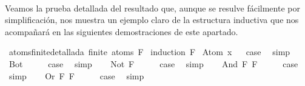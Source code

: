 \begin{isabellebody}
\begin{isamarkuptext}
\\%
\end{isamarkuptext}\isamarkuptrue%
%
\begin{isamarkuptext}%
Veamos la prueba detallada del resultado que, aunque se resulve 
fácilmente por simplificación, nos muestra un ejemplo claro de la estructura inductiva
que nos acompañará en las siguientes demostraciones de este apartado.%
\end{isamarkuptext}\isamarkuptrue%
\isamarkupfalse%
\ atoms{\isacharunderscore}finite{\isacharunderscore}detallada{\isacharcolon}\ {\isachardoublequoteopen}finite\ {\isacharparenleft}atoms\ F{\isacharparenright}{\isachardoublequoteclose}\isanewline
%
\isadelimproof
%
\endisadelimproof
%
\isatagproof
{}\isamarkupfalse%
\ {\isacharparenleft}induction\ F{\isacharparenright}\isanewline
{}\isamarkupfalse%
\ {\isacharparenleft}Atom\ x{\isacharparenright}\isanewline
{}\isamarkupfalse%
\ \isamarkupfalse%
\ {\isacharquery}case\ \isamarkupfalse%
\ simp\isanewline
{}\isamarkupfalse%
\isanewline
{}\isamarkupfalse%
\ Bot\isanewline
\ \ \isamarkupfalse%
\ \isamarkupfalse%
\ {\isacharquery}case\ \isamarkupfalse%
\ simp\isanewline
{}\isamarkupfalse%
\isanewline
\ \ \isamarkupfalse%
\ {\isacharparenleft}Not\ F{\isacharparenright}\isanewline
\ \ \isamarkupfalse%
\ \isamarkupfalse%
\ {\isacharquery}case\ \isamarkupfalse%
\ simp\isanewline
{}\isamarkupfalse%
\isanewline
\ \ \isamarkupfalse%
\ {\isacharparenleft}And\ F{}\ F{}{\isacharparenright}\isanewline
\ \ \isamarkupfalse%
\ \isamarkupfalse%
\ {\isacharquery}case\ \isamarkupfalse%
\ simp\isanewline
{}\isamarkupfalse%
\isanewline
\ \ \isamarkupfalse%
\ {\isacharparenleft}Or\ F{}\ F{}{\isacharparenright}\isanewline
\ \ \isamarkupfalse%
\ \isamarkupfalse%
\ {\isacharquery}case\ \isamarkupfalse%
\ simp\isanewline
{}\isamarkupfalse%
\isanewline
\ \ \isamarkupfalse%

\end{isabellebody}
